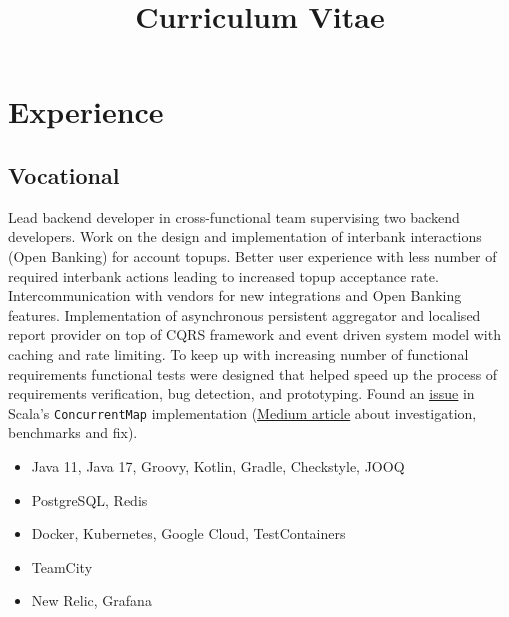 \documentclass[11pt,a4paper,sans]{moderncv}
\title{Curriculum Vitae}
\begin{document}
\makecvtitle

\section{Experience}
\subsection{Vocational}
{
Lead backend developer in cross-functional team supervising two backend developers. Work on the design and implementation of interbank interactions (Open Banking) for account topups. Better user experience with less number of required interbank actions leading to increased topup acceptance rate. Intercommunication with vendors for new integrations and Open Banking features. 
\newline
\newline
Implementation of asynchronous persistent aggregator and localised report provider on top of CQRS framework and event driven system model with caching and rate limiting. To keep up with increasing number of functional requirements functional tests were designed that helped speed up the process of requirements verification, bug detection, and prototyping.
\newline
\newline
Found an \href{https://github.com/scala/bug/issues/12586}{\underline{\color{blue}issue}} in Scala's \texttt{ConcurrentMap} implementation (\href{https://medium.com/@igabaydulin/java-concurrenthashmap-vs-scala-concurrent-map-e185e8a0b798}{\underline{\color{blue}Medium article}} about investigation, benchmarks and fix).
\begin{itemize}
\item Java 11, Java 17, Groovy, Kotlin, Gradle, Checkstyle, JOOQ
\item PostgreSQL, Redis
\item Docker, Kubernetes, Google Cloud, TestContainers
\item TeamCity
\item New Relic, Grafana
\end{itemize}
}
\end{document}
